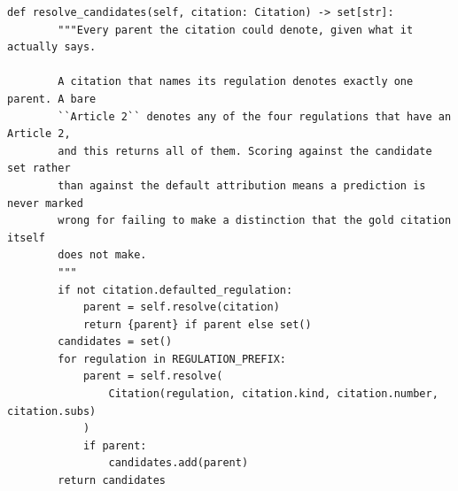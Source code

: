 \begin{lstlisting}[style=thesis,caption={Ambiguous gold citations resolve to a candidate set, not to a default attribution. Source: \texttt{src/aviation\_rag/evaluation/citations.py}, lines 138--158.},label={lst:cite-candidates}]
    def resolve_candidates(self, citation: Citation) -> set[str]:
        """Every parent the citation could denote, given what it actually says.

        A citation that names its regulation denotes exactly one parent. A bare
        ``Article 2`` denotes any of the four regulations that have an Article 2,
        and this returns all of them. Scoring against the candidate set rather
        than against the default attribution means a prediction is never marked
        wrong for failing to make a distinction that the gold citation itself
        does not make.
        """
        if not citation.defaulted_regulation:
            parent = self.resolve(citation)
            return {parent} if parent else set()
        candidates = set()
        for regulation in REGULATION_PREFIX:
            parent = self.resolve(
                Citation(regulation, citation.kind, citation.number, citation.subs)
            )
            if parent:
                candidates.add(parent)
        return candidates
\end{lstlisting}

